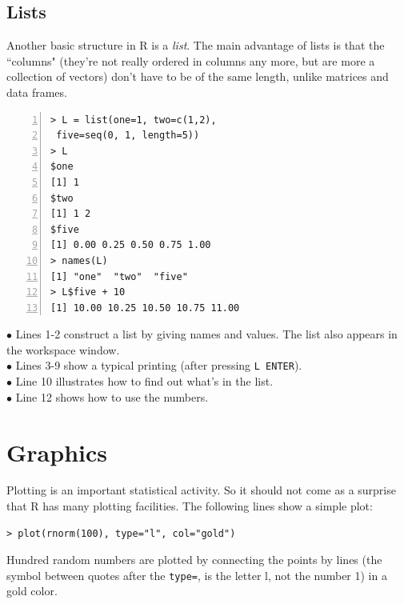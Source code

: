 \documentclass[a4paper,11pt,twocolumn,tablecaptionabove]{scrartcl} %
\begin{document}
\subsection{Lists}

Another basic structure in R is a \emph{list}. The main advantage of lists is that the ``columns" (they're not really ordered in columns any more, but are more a collection of vectors) don't have to be of the same length, unlike matrices and data frames. 

\begin{Verbatim}[frame=single,numbers=left,gobble=0, xleftmargin=0.35cm, numbersep=0.1cm]
> L = list(one=1, two=c(1,2), 
 five=seq(0, 1, length=5))
> L
$one
[1] 1
$two
[1] 1 2
$five
[1] 0.00 0.25 0.50 0.75 1.00
> names(L)
[1] "one"  "two"  "five"
> L$five + 10
[1] 10.00 10.25 10.50 10.75 11.00
\end{Verbatim}

\noindent $\bullet$ Lines 1-2 construct a list by giving names and values. The list also appears in the workspace window.\\
\noindent $\bullet$ Lines 3-9 show a typical printing (after pressing \texttt{L ENTER}). \\
\noindent $\bullet$ Line 10 illustrates how to find out what's in the list.\\
\noindent $\bullet$ Line 12 shows how to use the numbers. \\


\section{Graphics}
\label{sec:some-plotting}

Plotting is an important statistical activity. So it should not come as a
surprise that R has many plotting facilities. 
The following lines show a simple plot:
\begin{Verbatim}[frame=single,gobble=0]
> plot(rnorm(100), type="l", col="gold")
\end{Verbatim}

\noindent Hundred random numbers are plotted by connecting the points by lines (the
symbol between quotes after the \texttt{type=}, is the letter l, not the
number 1) in a gold color.
\end{document}

